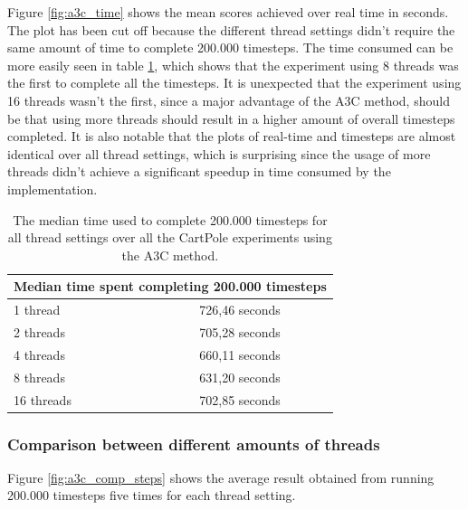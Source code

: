 \documentclass[11pt]{article}
\begin{document}
Figure \ref{fig:a3c_time} shows the mean scores achieved over real time in seconds.
The plot has been cut off because the different thread settings didn't require the
same amount of time to complete 200.000 timesteps.
The time consumed can be more easily seen in table \ref{tab:time}, which shows that
the experiment using 8 threads was the first to complete all the timesteps.
It is unexpected that the experiment using 16 threads wasn't the first,
since a major advantage of the A3C method,
should be that using more threads should result in a higher amount of overall timesteps completed.
It is also notable that the plots of real-time and timesteps are almost identical
over all thread settings, which is surprising since the usage of more
threads didn't achieve a significant speedup
in time consumed by the implementation.
\begin{table}[H]
    \centering
 \begin{tabular}{ |l|c| }
  \hline
  \multicolumn{2}{|c|}{Median time spent completing 200.000 timesteps} \\
  \hline
  1 thread & 726,46 seconds \\
  \hline
  2 threads & 705,28 seconds \\
  \hline
  4 threads & 660,11 seconds \\
  \hline
  8 threads & 631,20 seconds \\
  \hline
  16 threads & 702,85 seconds \\
  \hline
 \end{tabular}
 \caption{The median time used to complete 200.000 timesteps
 for all thread settings over all the CartPole experiments using the A3C method.}
    \label{tab:time}
\end{table}


\subsubsection{Comparison between different amounts of threads}

Figure \ref{fig:a3c_comp_steps} shows the average result obtained from running 200.000
timesteps five times for each thread setting.
\end{document}
